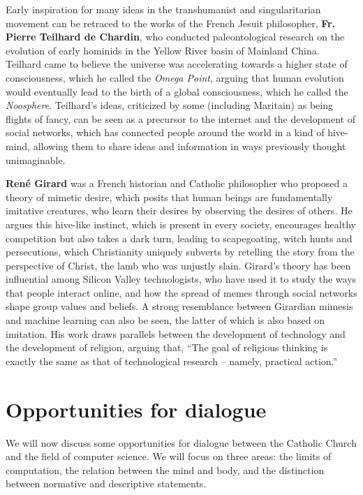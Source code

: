 \documentclass[sigplan,nonacm]{acmart}\settopmatter{printfolios=false,printccs=false,printacmref=false}
\begin{document}
  Early inspiration for many ideas in the transhumanist and singularitarian movement can be retraced to the works of the French Jesuit philosopher, \textbf{Fr. Pierre Teilhard de Chardin}, who conducted paleontological research on the evolution of early hominids in the Yellow River basin of Mainland China. Teilhard came to believe the universe was accelerating towards a higher state of consciousness, which he called the \textit{Omega Point}, arguing that human evolution would eventually lead to the birth of a global consciousness, which he called the \textit{Noosphere}. Teilhard's ideas, criticized by some (including Maritain) as being flights of fancy, can be seen as a precursor to the internet and the development of social networks, which has connected people around the world in a kind of hive-mind, allowing them to share ideas and information in ways previously thought unimaginable.

  \textbf{Ren\'e Girard} was a French historian and Catholic philosopher who proposed a theory of mimetic desire, which posits that human beings are fundamentally imitative creatures, who learn their desires by observing the desires of others. He argues this hive-like instinct, which is present in every society, encourages healthy competition but also takes a dark turn, leading to scapegoating, witch hunts and persecutions, which Christianity uniquely subverts by retelling the story from the perspective of Christ, the lamb who was unjustly slain. Girard's theory has been influential among Silicon Valley technologists, who have used it to study the ways that people interact online, and how the spread of memes through social networks shape group values and beliefs. A strong resemblance between Girardian mimesis and machine learning can also be seen, the latter of which is also based on imitation. His work draws parallels between the development of technology and the development of religion, arguing that, ``The goal of religious thinking is exactly the same as that of technological research -- namely, practical action.''~\cite{girard1977violence}

  \clearpage

  \section{Opportunities for dialogue}

  We will now discuss some opportunities for dialogue between the Catholic Church and the field of computer science. We will focus on three areas: the limits of computation, the relation between the mind and body, and the distinction between normative and descriptive statements.
\end{document}

